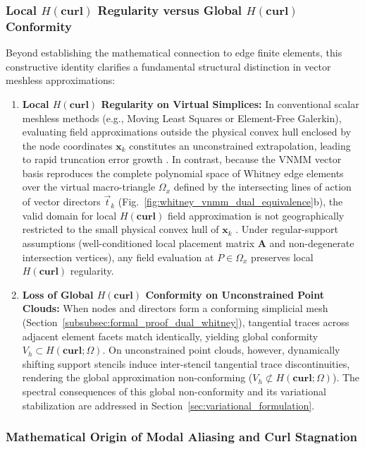 \documentclass[preprint,12pt]{elsarticle}
\begin{document}
\subsubsection{Local \texorpdfstring{$H(\mathbf{curl})$}{H(curl)} Regularity versus Global \texorpdfstring{$H(\mathbf{curl})$}{H(curl)} Conformity}
Beyond establishing the mathematical connection to edge finite elements, this constructive identity clarifies a fundamental structural distinction in vector meshless approximations:
\begin{enumerate}
    \item \textbf{Local $H(\mathbf{curl})$ Regularity on Virtual Simplices:} In conventional scalar meshless methods (e.g., Moving Least Squares or Element-Free Galerkin), evaluating field approximations outside the physical convex hull enclosed by the node coordinates $\mathbf{x}_k$ constitutes an unconstrained extrapolation, leading to rapid truncation error growth \cite{lima2017edge}. In contrast, because the VNMM vector basis reproduces the complete polynomial space of Whitney edge elements over the virtual macro-triangle $\Omega_{x}$ defined by the intersecting lines of action of vector directors $\vec{t}_k$ (Fig.~\ref{fig:whitney_vnmm_dual_equivalence}b), the valid domain for local $H(\mathbf{curl})$ field approximation is not geographically restricted to the small physical convex hull of $\mathbf{x}_k$ \cite{nedelec1980mixed, monk2003finite}. Under regular-support assumptions (well-conditioned local placement matrix $\mathbf{A}$ and non-degenerate intersection vertices), any field evaluation at $P \in \Omega_{x}$ preserves local $H(\mathbf{curl})$ regularity.
    \item \textbf{Loss of Global $H(\mathbf{curl})$ Conformity on Unconstrained Point Clouds:} When nodes and directors form a conforming simplicial mesh (Section~\ref{subsubsec:formal_proof_dual_whitney}), tangential traces across adjacent element facets match identically, yielding global conformity $V_h \subset H(\mathbf{curl}; \Omega)$. On unconstrained point clouds, however, dynamically shifting support stencils induce inter-stencil tangential trace discontinuities, rendering the global approximation non-conforming ($V_h \not\subset H(\mathbf{curl}; \Omega)$). The spectral consequences of this global non-conformity and its variational stabilization are addressed in Section~\ref{sec:variational_formulation}.
\end{enumerate}

\subsubsection{Mathematical Origin of Modal Aliasing and Curl Stagnation}
\label{subsec:L1_aliasing_analysis}
\end{document}
